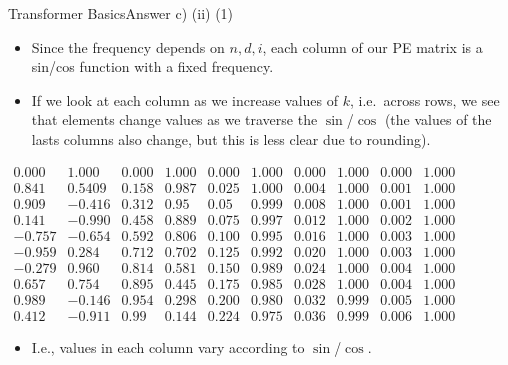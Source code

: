 \documentclass[t]{beamer}
\begin{document}
\begin{frame}{Transformer Basics}{Answer c) (ii) (1)}
    \begin{itemize}
        \item Since the frequency depends on $n,d,i$, each column of our PE
              matrix is a sin/cos function with a fixed frequency.
        \item If we look at each column as we increase values of $k$,
              i.e.\ across rows, we see that elements change values as
              we traverse the $\sin$/$\cos$ (the values of the lasts
              columns also change, but this is less clear due to
              rounding).
    \end{itemize}
    {\scriptsize
    \begin{center}
        $\begin{matrix}
                0.000  & 1.000  & 0.000 & 1.000 & 0.000 & 1.000 & 0.000 & 1.000 & 0.000 & 1.000 \\
                0.841  & 0.5409 & 0.158 & 0.987 & 0.025 & 1.000 & 0.004 & 1.000 & 0.001 & 1.000 \\
                0.909  & -0.416 & 0.312 & 0.95  & 0.05  & 0.999 & 0.008 & 1.000 & 0.001 & 1.000 \\
                0.141  & -0.990 & 0.458 & 0.889 & 0.075 & 0.997 & 0.012 & 1.000 & 0.002 & 1.000 \\
                -0.757 & -0.654 & 0.592 & 0.806 & 0.100 & 0.995 & 0.016 & 1.000 & 0.003 & 1.000 \\
                -0.959 & 0.284  & 0.712 & 0.702 & 0.125 & 0.992 & 0.020 & 1.000 & 0.003 & 1.000 \\
                -0.279 & 0.960  & 0.814 & 0.581 & 0.150 & 0.989 & 0.024 & 1.000 & 0.004 & 1.000 \\
                0.657  & 0.754  & 0.895 & 0.445 & 0.175 & 0.985 & 0.028 & 1.000 & 0.004 & 1.000 \\
                0.989  & -0.146 & 0.954 & 0.298 & 0.200 & 0.980 & 0.032 & 0.999 & 0.005 & 1.000 \\
                0.412  & -0.911 & 0.99  & 0.144 & 0.224 & 0.975 & 0.036 & 0.999 & 0.006 & 1.000
            \end{matrix}$
    \end{center}
    }
    \begin{itemize}
        \item I.e., values in each column vary according to $\sin$/$\cos$.
    \end{itemize}
\end{frame}
\end{document}
